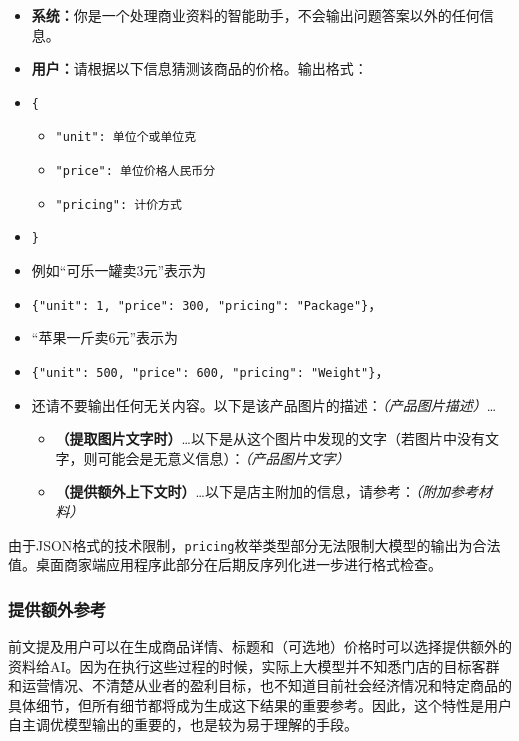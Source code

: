 \begin{itemize}
    \item[] \textbf{系统：}你是一个处理商业资料的智能助手，不会输出问题答案以外的任何信息。
    \item[] \textbf{用户：}请根据以下信息猜测该商品的价格。输出格式：
    \item[] \verb|{|
    \begin{itemize}
        \item[] \verb|"unit": 单位个或单位克|
        \item[] \verb|"price": 单位价格人民币分|
        \item[] \verb|"pricing": 计价方式|
    \end{itemize}
    \item[] \verb|}|
    \item[] 例如“可乐一罐卖3元”表示为
    \item[] \verb|{"unit": 1, "price": 300, "pricing": "Package"}|，
    \item[] “苹果一斤卖6元”表示为
    \item[] \verb|{"unit": 500, "price": 600, "pricing": "Weight"}|，
    \item[] 还请不要输出任何无关内容。以下是该产品图片的描述：\textit{（产品图片描述）}\dots
    \begin{itemize}
        \item[] \textbf{（提取图片文字时）}\dots 以下是从这个图片中发现的文字（若图片中没有文字，则可能会是无意义信息）：\textit{（产品图片文字）}
        \item[] \textbf{（提供额外上下文时）}\dots 以下是店主附加的信息，请参考：\textit{（附加参考材料）}
    \end{itemize}
\end{itemize}

由于JSON格式的技术限制，\verb|pricing|枚举类型部分无法限制大模型的输出为合法值。桌面商家端应用程序此部分在后期反序列化进一步进行格式检查。

\subsubsection{提供额外参考}

前文提及用户可以在生成商品详情、标题和（可选地）价格时可以选择提供额外的资料给AI。因为在执行这些过程的时候，实际上大模型并不知悉门店的目标客群和运营情况、不清楚从业者的盈利目标，也不知道目前社会经济情况和特定商品的具体细节，但所有细节都将成为生成这下结果的重要参考。因此，这个特性是用户自主调优模型输出的重要的，也是较为易于理解的手段。


